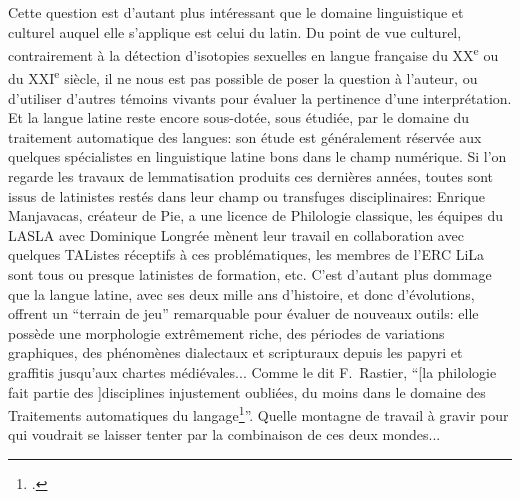 Cette question est d'autant plus intéressant que le domaine linguistique et culturel auquel elle s'applique est celui du latin. Du point de vue culturel, contrairement à la détection d'isotopies sexuelles en langue française du XX\textsuperscript{e} ou du XXI\textsuperscript{e} siècle, il ne nous est pas possible de poser la question à l'auteur, ou d'utiliser d'autres témoins vivants pour évaluer la pertinence d'une interprétation. Et la langue latine reste encore sous-dotée, sous étudiée, par le domaine du traitement automatique des langues: son étude est généralement réservée aux quelques spécialistes en linguistique latine bons dans le champ numérique. Si l'on regarde les travaux de lemmatisation produits ces dernières années, toutes sont issus de latinistes restés dans leur champ ou transfuges disciplinaires: Enrique Manjavacas, créateur de Pie, a une licence de Philologie classique, les équipes du LASLA avec Dominique Longrée mènent leur travail en collaboration avec quelques TAListes réceptifs à ces problématiques, les membres de l'ERC LiLa sont tous ou presque latinistes de formation, etc. C'est d'autant plus dommage que la langue latine, avec ses deux mille ans d'histoire, et donc d'évolutions, offrent un \enquote{terrain de jeu} remarquable pour évaluer de nouveaux outils: elle possède une morphologie extrêmement riche, des périodes de variations graphiques, des phénomènes dialectaux et scripturaux depuis les papyri et graffitis jusqu'aux chartes médiévales... Comme le dit F.~Rastier, \enquote{[la philologie fait partie des ]disciplines injustement oubliées, du moins dans le domaine des Traitements automatiques du langage\footcite{rastier2005enjeux}}. Quelle montagne de travail à gravir pour qui voudrait se laisser tenter par la combinaison de ces deux mondes...

